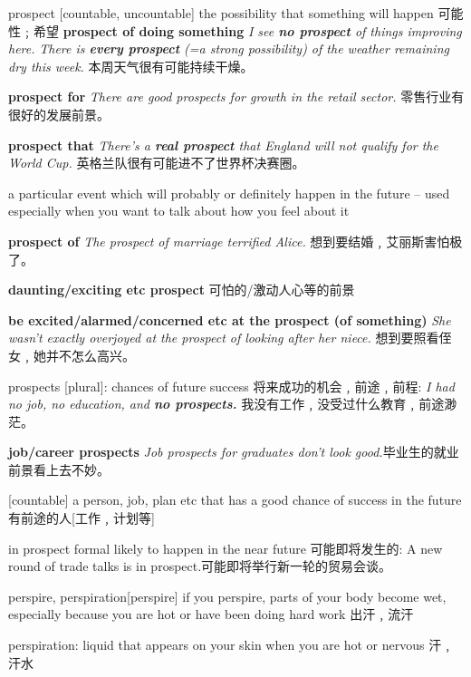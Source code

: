 \begin{word}{prospect}
    [countable, uncountable] the possibility that something will happen 可能性﹔希望
    \textbf{prospect of doing something}
    \textit{I see \textbf{no prospect} of things improving here.}
    \textit{There is \textbf{every prospect} (=a strong possibility) of the weather remaining dry this week.} 本周天气很有可能持续干燥。
    
    \textbf{prospect for}
    \textit{There are good prospects for growth in the retail sector.} 零售行业有很好的发展前景。

    \textbf{prospect that}
    \textit{There’s a \textbf{real prospect} that England will not qualify for the World Cup.} 英格兰队很有可能进不了世界杯决赛圈。

    a particular event which will probably or definitely happen in the future – used especially when you want to talk about how you feel about it

    \textbf{prospect of}
    \textit{The prospect of marriage terrified Alice.} 想到要结婚﹐艾丽斯害怕极了。
    
\textbf{daunting/exciting etc prospect} 可怕的/激动人心等的前景

\textbf{be excited/alarmed/concerned etc at the prospect (of something)}
 \textit{She wasn’t exactly overjoyed at the prospect of looking after her niece.} 想到要照看侄女﹐她并不怎么高兴。

prospects [plural]: chances of future success 将来成功的机会﹐前途﹐前程:
 \textit{I had no job, no education, and \textbf{no prospects.}} 我没有工作﹐没受过什么教育﹐前途渺茫。

\textbf{job/career prospects}
 \textit{Job prospects for graduates don’t look good.}毕业生的就业前景看上去不妙。

[countable] a person, job, plan etc that has a good chance of success in the future 有前途的人[工作﹐计划等]

in prospect formal likely to happen in the near future 可能即将发生的:
 A new round of trade talks is in prospect.可能即将举行新一轮的贸易会谈。
\end{word}

\begin{wordRef}{perspire, perspiration}[perspire]
    if you perspire, parts of your body become wet, especially because you are hot or have been doing hard work 出汗﹐流汗

    perspiration: liquid that appears on your skin when you are hot or nervous 汗﹐汗水
\end{wordRef}